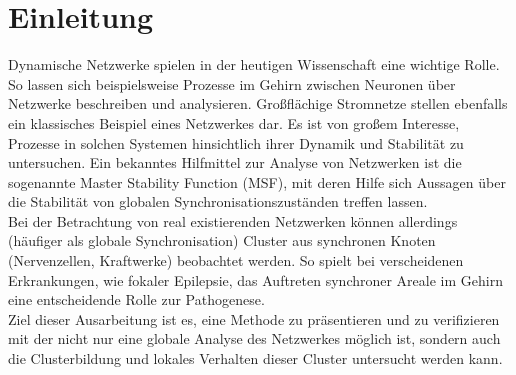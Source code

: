 \section{Einleitung}\label{einleitung}
Dynamische Netzwerke spielen in der heutigen Wissenschaft eine wichtige Rolle. So lassen sich beispielsweise Prozesse im Gehirn zwischen Neuronen über Netzwerke beschreiben und analysieren. Großflächige Stromnetze stellen ebenfalls ein klassisches Beispiel eines Netzwerkes dar. Es ist von großem Interesse, Prozesse in solchen Systemen hinsichtlich ihrer Dynamik und Stabilität zu untersuchen. Ein bekanntes Hilfmittel zur Analyse von Netzwerken ist die sogenannte Master Stability Function (MSF), mit deren Hilfe sich Aussagen über die Stabilität von globalen Synchronisationszuständen treffen lassen.\\
Bei der Betrachtung von real existierenden Netzwerken können allerdings (häufiger als globale Synchronisation) Cluster aus synchronen Knoten (Nervenzellen, Kraftwerke) beobachtet werden. So spielt bei verscheidenen Erkrankungen, wie fokaler Epilepsie, das Auftreten synchroner Areale im Gehirn eine entscheidende Rolle zur Pathogenese.\\
Ziel dieser Ausarbeitung ist es, eine Methode zu präsentieren und zu verifizieren mit der nicht nur eine globale Analyse des Netzwerkes möglich ist, sondern auch die Clusterbildung und lokales Verhalten dieser Cluster untersucht werden kann.